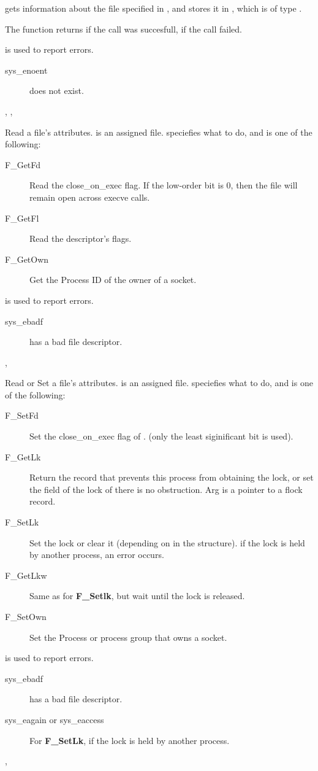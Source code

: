 

{
 gets information about the file specified in , and stores it in 
, which is of type .

The function returns  if the call was succesfull,  if the call
failed.
}
{  is used to report errors.
\begin{description}
\item[sys\_enoent]  does not exist.
\end{description}
}
{, , }



{
Read a file's attributes.  is an assigned file.
 speciefies what to do, and is one of the following:
\begin{description}
\item[F\_GetFd] Read the close\_on\_exec flag. If the low-order bit is 0, then
the file will remain open across execve calls.
\item[F\_GetFl] Read the descriptor's flags.
\item[F\_GetOwn] Get the Process ID of the owner of a socket.
\end{description}
}
{
 is used to report errors.
\begin{description}
\item[sys\_ebadf]  has a bad file descriptor.
\end{description}
}
{,  }

{
Read or Set a file's attributes.  is an assigned file.
 speciefies what to do, and is one of the following:
\begin{description}
\item[F\_SetFd] Set the close\_on\_exec flag of . (only the least
siginificant bit is used).
\item[F\_GetLk] Return the  record that prevents this process from
obtaining the lock, or set the  field of the lock of there is no
obstruction. Arg is a pointer to a flock record.
\item[F\_SetLk] Set the lock or clear it (depending on  in the
 structure). if the lock is held by another process, an error
occurs.
\item[F\_GetLkw] Same as for \textbf{F\_Setlk}, but wait until the lock is
released.
\item[F\_SetOwn] Set the Process or process group that owns a socket.
\end{description}
}
{
 is used to report errors.
\begin{description}
\item[sys\_ebadf]  has a bad file descriptor.
\item[sys\_eagain or sys\_eaccess] For \textbf{F\_SetLk}, if the lock is
held by another process.
\end{description}
}
{,  }

